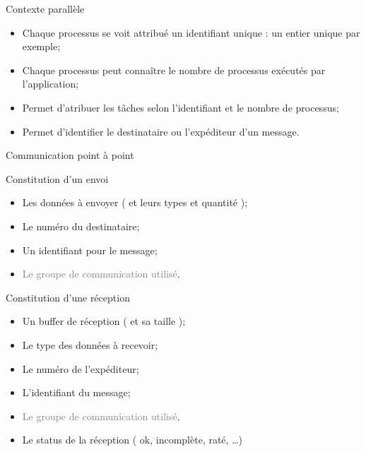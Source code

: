 \documentclass[handout]{beamer}
\begin{document}
\begin{frame}[fragile]{Contexte parallèle}

\begin{itemize}
\item Chaque processus se voit attribué un identifiant unique : un entier
unique par exemple;
\item Chaque processus peut connaître le nombre de processus
exécutés par l'application;
\item Permet d'atribuer les tâches selon l'identifiant et le nombre de processus;
\item Permet d'identifier le destinataire ou l'expéditeur d'un message.
\end{itemize}
\end{frame}

\begin{frame}[fragile]{Communication point à point}

\begin{block}{Constitution d'un envoi}
\begin{itemize}
\item Les données à envoyer ( et leurs types et quantité );
\item Le numéro du destinataire;
\item Un identifiant pour le message;
\item \textcolor{gray}{Le groupe de communication utilisé}.
\end{itemize}
\end{block}

\begin{block}{Constitution d'une réception}
\begin{itemize}
\item Un buffer de réception ( et sa taille );
\item Le type des données à recevoir;
\item Le numéro de l'expéditeur;
\item L'identifiant du message;
\item \textcolor{gray}{Le groupe de communication utilisé}.
\item Le status de la réception ( ok, incomplète, raté, \ldots )
\end{itemize}
\end{block}

\end{frame}
\end{document}
